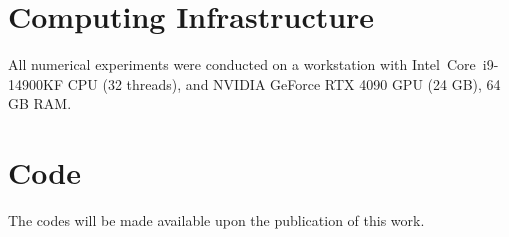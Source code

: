 \documentclass{article}
\begin{document}
\section{Computing Infrastructure}
\label{Computing_Infrastructure}
All numerical experiments were conducted on a
workstation with
Intel\textregistered\ Core\texttrademark\ i9-14900KF CPU (32 threads),
and NVIDIA GeForce RTX 4090 GPU (24 GB), 64 GB RAM.
\section{Code}
The codes will be made available upon the publication of this work.
\end{document}
